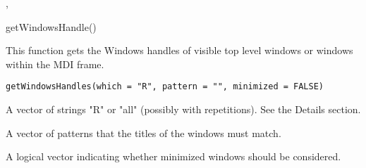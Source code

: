 %
\begin{SeeAlso}\relax
{}, 
\end{SeeAlso}
%
\begin{Examples}
\begin{ExampleCode}
getWindowsHandle()
\end{ExampleCode}
\end{Examples}
%
\begin{Description}\relax
This function gets the Windows handles of visible top level windows or
windows within the \R{} MDI frame.
\end{Description}
%
\begin{Usage}
\begin{verbatim}
getWindowsHandles(which = "R", pattern = "", minimized = FALSE)
\end{verbatim}
\end{Usage}
%
\begin{Arguments}
\begin{ldescription}
\item[\code{which}] 
A vector of strings "R" or "all" (possibly with repetitions).  See
the Details section.

\item[\code{pattern}] 
A vector of patterns that the titles of the windows must match.

\item[\code{minimized}] 
A logical vector indicating whether minimized windows should be considered.

\end{ldescription}
\end{Arguments}
%
